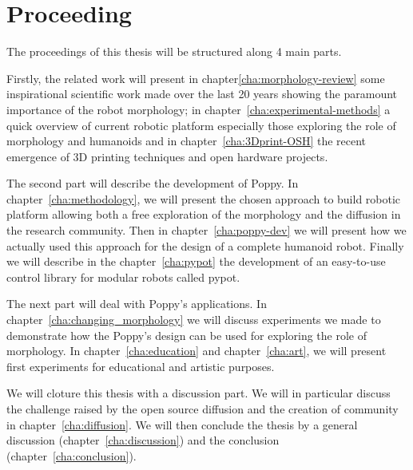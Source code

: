 \section*{Proceeding} %
The proceedings of this thesis will be structured along 4 main parts.

Firstly, the related work will present in chapter\ref{cha:morphology-review} some inspirational scientific work made over the last 20 years showing the paramount importance of the robot morphology; in chapter~\ref{cha:experimental-methods} a quick overview of current robotic platform especially those exploring the role of morphology and humanoids and in chapter~\ref{cha:3Dprint-OSH} the recent emergence of 3D printing techniques and open hardware projects.

The second part will describe the development of Poppy. In chapter~\ref{cha:methodology}, we will present the chosen approach to build robotic platform allowing both a free exploration of the morphology and the diffusion in the research community. Then in chapter~\ref{cha:poppy-dev} we will present how we actually used this approach for the design of a complete humanoid robot. Finally we will describe in the chapter~\ref{cha:pypot} the development of an easy-to-use control library for modular robots called pypot.

The next part will deal with Poppy's applications. In chapter~\ref{cha:changing_morphology} we will discuss experiments we made to demonstrate how the Poppy's design can be used for exploring the role of morphology. In chapter~\ref{cha:education} and chapter~\ref{cha:art}, we will present first experiments for educational and artistic purposes.

We will cloture this thesis with a discussion part. We will in particular discuss the challenge raised by the open source diffusion and the creation of community in chapter~\ref{cha:diffusion}. We will then conclude the thesis by a general discussion (chapter~\ref{cha:discussion}) and the conclusion (chapter~\ref{cha:conclusion}).
